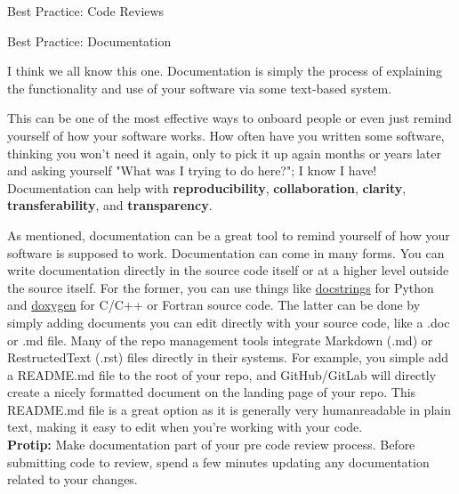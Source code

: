 \documentclass[final]{beamer}
\newlength{\colwidth}
\begin{document}
\begin{frame}[t]
\begin{columns}[t]
\begin{column}{\colwidth}
\begin{block}{Best Practice: Code Reviews}
  \end{block}

  \begin{block}{Best Practice: Documentation}

    I think we all know this one.
    Documentation is simply the process of explaining the functionality and use
    of your software via some text-based system.

    This can be one of the most effective ways to onboard people or even just
    remind yourself of how your software works.
    How often have you written some software, thinking you won't need it again,
    only to pick it up again months or years later and asking yourself "What was
    I trying to do here?"; I know I have!
    Documentation can help with \textbf{reproducibility},
    \textbf{collaboration}, \textbf{clarity}, \textbf{transferability}, and
    \textbf{transparency}.

    As mentioned, documentation can be a great tool to remind yourself of how
    your software is supposed to work.
    Documentation can come in many forms.
    You can write documentation directly in the source code itself or at a
    higher level outside the source itself.
    For the former, you can use things like
    \href{https://realpython.com/documenting-python-code/}{docstrings} for
    Python and \href{https://www.doxygen.nl/manual/docblocks.html}{doxygen} for
    C/C++ or Fortran source code.
    The latter can be done by simply adding documents you can edit directly
    with your source code, like a .doc or .md file.
    Many of the repo management tools integrate Markdown (.md) or RestructedText
    (.rst) files directly in their systems.
    For example, you simple add a README.md file to the root of your repo, and
    GitHub/GitLab will directly create a nicely formatted document on the
    landing page of your repo.
    This README.md file is a great option as it is generally very humanreadable
    in plain text, making it easy to edit when you're working with your code.
    \\ \vspace{0.5em}
    \textbf{Protip:} Make documentation part of your pre code review process.
    Before submitting code to review, spend a few minutes updating any
    documentation related to your changes.
    \\ \vspace{0.5em}


\end{block}
\end{column}
\end{columns}
\end{frame}
\end{document}
